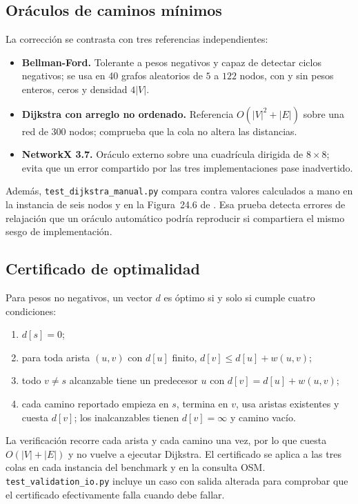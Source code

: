 \subsection{Oráculos de caminos mínimos}
La corrección se contrasta con tres referencias independientes:
\begin{itemize}
    \item \textbf{Bellman-Ford.} Tolerante a pesos negativos y capaz de detectar ciclos negativos; se usa en 40 grafos aleatorios de $5$ a $122$ nodos, con y sin pesos enteros, ceros y densidad $4|V|$.
    \item \textbf{Dijkstra con arreglo no ordenado.} Referencia $O(|V|^2+|E|)$ sobre una red de 300 nodos; comprueba que la cola no altera las distancias.
    \item \textbf{NetworkX 3.7.} Oráculo externo sobre una cuadrícula dirigida de $8\times 8$; evita que un error compartido por las tres implementaciones pase inadvertido.
\end{itemize}
Además, \texttt{test\_dijkstra\_manual.py} compara contra valores calculados a mano en la instancia de seis nodos y en la Figura~24.6 de \textcite{cormen2022introduction}. Esa prueba detecta errores de relajación que un oráculo automático podría reproducir si compartiera el mismo sesgo de implementación.

\subsection{Certificado de optimalidad}
Para pesos no negativos, un vector $d$ es óptimo si y solo si cumple cuatro condiciones:
\begin{enumerate}
    \item $d[s]=0$;
    \item para toda arista $(u,v)$ con $d[u]$ finito, $d[v]\le d[u]+w(u,v)$;
    \item todo $v\ne s$ alcanzable tiene un predecesor $u$ con $d[v]=d[u]+w(u,v)$;
    \item cada camino reportado empieza en $s$, termina en $v$, usa aristas existentes y cuesta $d[v]$; los inalcanzables tienen $d[v]=\infty$ y camino vacío.
\end{enumerate}
La verificación recorre cada arista y cada camino una vez, por lo que cuesta $O(|V|+|E|)$ y no vuelve a ejecutar Dijkstra. El certificado se aplica a las tres colas en cada instancia del benchmark y en la consulta OSM. \texttt{test\_validation\_io.py} incluye un caso con salida alterada para comprobar que el certificado efectivamente falla cuando debe fallar.

